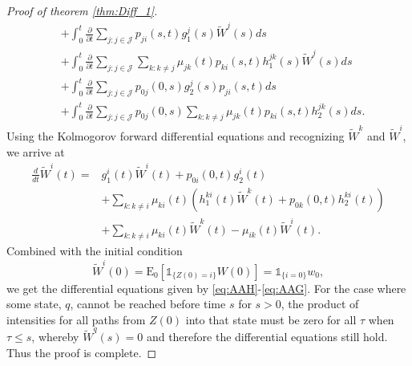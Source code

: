 \documentclass[12pt]{article}
\newcommand{\E}{\text{E}}
\newcommand{\indic}[1]{\mathds{1}_{ \{ #1 \} }}
\theoremstyle{my_thm}
\begin{document}
\begin{proof}[Proof of theorem \ref{thm:Diff_1}]
\begin{align*}
&+
\int_0^t \frac{\partial}{\partial t}  \sum_{j:j \in \mathcal{J}} p_{ji}(s,t) g_1^j(s) \tilde{W}^j(s)  ds
\\
&+
\int_0^t \frac{\partial}{\partial t}  \sum_{j:j \in \mathcal{J}} \sum_{k:k \neq j}  \mu_{jk}(t) p_{ki}(s,t)  h^{jk}_1(s) \tilde{W}^j(s)   ds
\\
&+
\int_0^t \frac{\partial}{\partial t}  \sum_{j:j \in \mathcal{J}} p_{0j}(0,s)g_2^j(s)p_{ji}(s,t) ds
\\
&+
\int_0^t \frac{\partial}{\partial t} \sum_{j:j \in \mathcal{J}} p_{0j}(0,s)  \sum_{k:k \neq j}  \mu_{jk}(t) p_{ki}(s,t)h_2^{jk}(s) ds.
\end{align*}
Using the Kolmogorov forward differential equations and recognizing $\tilde{W}^k$ and $\tilde{W}^i$, we arrive at
\begin{align*}
\frac{d}{dt}\tilde{W}^i(t)=&
g^i_1(t) \tilde{W}^i(t) +p_{0i}(0,t)g^i_2(t)\\
&+
\sum_{k:k \neq i} \mu_{ki}(t) \left(   h^{ki}_1(t) \tilde{W}^k(t) + p_{0k}(0,t)h^{ki}_2(t) \right)
\\
&+
\sum_{k:k \neq i} \mu_{ki}(t) \tilde{W}^k(t)-\mu_{ik}(t)\tilde{W}^i(t).
\end{align*}
Combined with the initial condition
$$
\tilde{W}^i(0)=\E_0[\indic{Z(0)=i}W(0)]=\indic{i=0}w_0,
$$
we get the differential equations given by \eqref{eq:AAH}-\eqref{eq:AAG}. For the case where some state, $q$, cannot be reached before time $s$ for $s>0$, the product of intensities for all paths from $Z(0)$ into that state must be zero for all $\tau$ when $\tau \leq s$, whereby $\tilde{W}^q(s)=0$ and therefore the differential equations still hold. Thus the proof is complete.
\end{proof}

\iffalse
\end{document}
